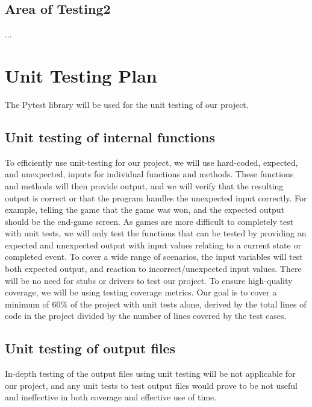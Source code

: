 \documentclass[12pt, titlepage]{article}
\begin{document}
\subsection{Area of Testing2}

...
	
\section{Unit Testing Plan}

The Pytest library will be used for the unit testing of our project.
		
\subsection{Unit testing of internal functions}

To efficiently use unit-testing for our project, we will use hard-coded, expected, and unexpected, inputs for individual functions and methods. These functions and methods will then provide output, and we will verify that the resulting output is correct or that the program handles the unexpected input correctly. For example, telling the game that the game was won, and the expected output should be the end-game screen. As games are more difficult to completely test with unit tests, we will only test the functions that can be tested by providing an expected and unexpected output with input values relating to a current state or completed event. To cover a wide range of scenarios, the input variables will test both expected output, and reaction to incorrect/unexpected input values. There will be no need for stubs or drivers to test our project. To ensure high-quality coverage, we will be using testing coverage metrics. Our goal is to cover a minimum of 60\% of the project with unit tests alone, derived by the total lines of code in the project divided by the number of lines covered by the test cases.
	
\subsection{Unit testing of output files}	

In-depth testing of the output files using unit testing will be not applicable for our project, and any unit tests to test output files would prove to be not useful and ineffective in both coverage and effective use of time.


\end{document}
